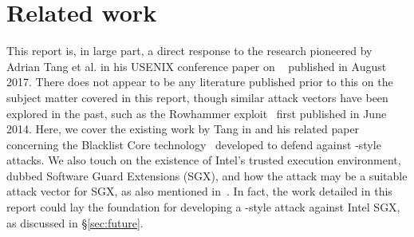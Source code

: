 \chapter{Related work}

This report is, in large part, a direct response to the research pioneered by
Adrian Tang et al. in his USENIX conference paper on \clkscrew{}~\cite{clkscrew}
published in August 2017. There does not appear to be any literature published
prior to this on the subject matter covered in this
report, though similar attack vectors have been explored in the past, such as
the Rowhammer exploit~\cite{rowhammer} first published in June 2014. Here, we
cover the existing work by Tang in \cite{clkscrew} and his related paper
concerning the Blacklist Core technology~\cite{blacklistCore} developed to
defend against \clkscrew{}-style attacks. We also touch on the existence of
Intel's trusted execution environment, dubbed Software Guard Extensions (SGX),
and how the \clkscrew{} attack may be a suitable attack vector for SGX, as also
mentioned in~\cite{securityOfSGX}. In fact, the work detailed in this report
could lay the foundation for developing a \clkscrew{}-style attack against
Intel SGX, as discussed in §\ref{sec:future}.






